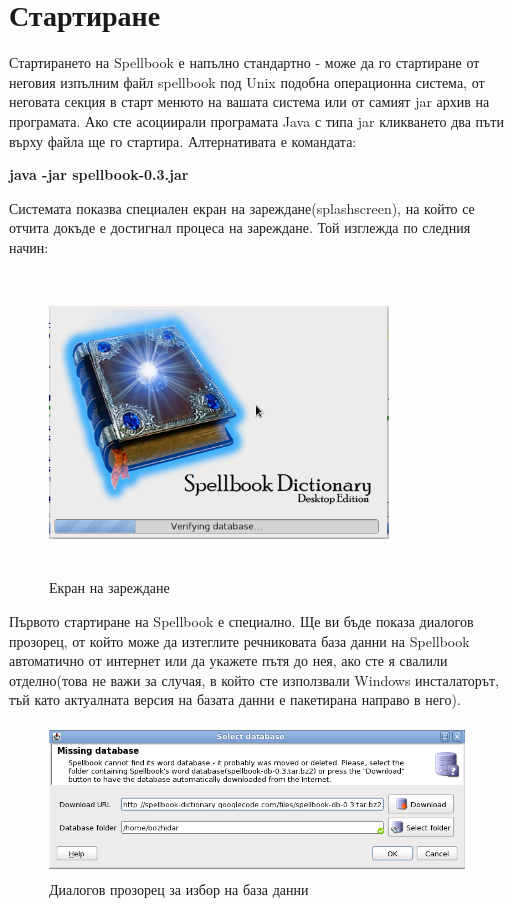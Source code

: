 \section{Стартиране}
Стартирането на Spellbook е напълно стандартно - може да го стартиране
от неговия изпълним файл spellbook под Unix подобна операционна
система, от неговата секция в старт менюто на вашата система или от
самият jar архив на програмата. Ако сте асоциирали програмата Java с
типа jar кликването два пъти върху файла ще го стартира. Алтернативата
е командата:

\textbf{java -jar spellbook-0.3.jar}

Системата показва специален екран на зареждане(splashscreen), на който
се отчита докъде е достигнал процеса на зареждане. Той изглежда по
следния начин:

\begin{figure}[htbp]
  \caption{Екран на зареждане}
  \centering
  \includegraphics[width=90mm, height=80mm]{images/splashscreen.png}
\end{figure}

Първото стартиране на Spellbook е специално. Ще ви бъде показа
диалогов прозорец, от който може да изтеглите речниковата база данни
на Spellbook автоматично от интернет или да укажете пътя до нея, ако
сте я свалили отделно(това не важи за случая, в който сте използвали
Windows инсталаторът, тъй като актуалната версия на базата данни е
пакетирана направо в него).
\begin{figure}[htbp]
  \caption{Диалогов прозорец за избор на база данни}
  \centering
  \includegraphics[width=110mm, height=40mm]{images/select_db.png}
\end{figure}


